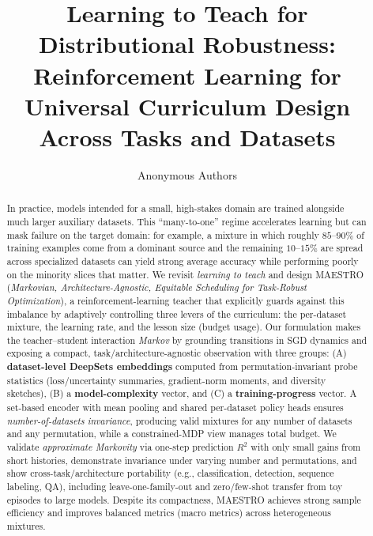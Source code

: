 \documentclass[11pt]{article}
\title{\textbf{Learning to Teach for Distributional Robustness: \\Reinforcement Learning for Universal Curriculum Design Across Tasks and Datasets}}
\author{Anonymous Authors}
\date{}
\newcommand{\1}{\mathbf{1}}
\newcommand{\MAESTRO}{\textsc{MAESTRO}\xspace}
\begin{document}
\maketitle

\begin{abstract}
In practice, models intended for a small, high-stakes domain are trained alongside much larger auxiliary datasets. This “many-to-one” regime accelerates learning but can mask failure on the target domain: for example, a mixture in which roughly $85$–$90\%$ of training examples come from a dominant source and the remaining $10$–$15\%$ are spread across specialized datasets can yield strong average accuracy while performing poorly on the minority slices that matter. We revisit \emph{learning to teach} and design \MAESTRO{} (\emph{Markovian, Architecture-Agnostic, Equitable Scheduling for Task-Robust Optimization}), a reinforcement-learning teacher that explicitly guards against this imbalance by adaptively controlling three levers of the curriculum: the per-dataset mixture, the learning rate, and the lesson size (budget usage). Our formulation makes the teacher–student interaction \emph{Markov} by grounding transitions in SGD dynamics and exposing a compact, task/architecture-agnostic observation with three groups: (A) \textbf{dataset-level DeepSets embeddings} computed from permutation-invariant probe statistics (loss/uncertainty summaries, gradient-norm moments, and diversity sketches), (B) a \textbf{model-complexity} vector, and (C) a \textbf{training-progress} vector. A set-based encoder with mean pooling and shared per-dataset policy heads ensures \emph{number-of-datasets invariance}, producing valid mixtures for any number of datasets and any permutation, while a constrained-MDP view manages total budget. We validate \emph{approximate Markovity} via one-step prediction $R^2$ with only small gains from short histories, demonstrate invariance under varying number and permutations, and show cross-task/architecture portability (e.g., classification, detection, sequence labeling, QA), including leave-one-family-out and zero/few-shot transfer from toy episodes to large models. Despite its compactness, \MAESTRO{} achieves strong sample efficiency and improves balanced metrics (macro metrics) across heterogeneous mixtures.


\end{abstract}
\end{document}
